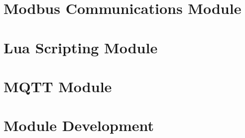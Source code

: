 	\chapter{Modbus Communications Module}

	\chapter{Lua Scripting Module}
	

	\chapter{MQTT Module}
	

	\chapter{Module Development}



